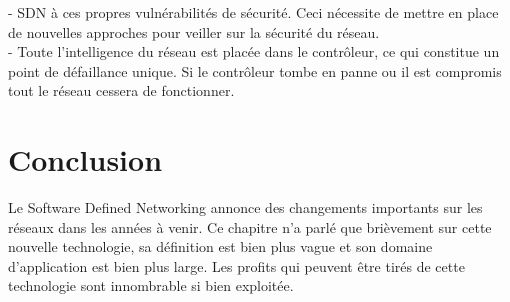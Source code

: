 \noindent- SDN à ces propres vulnérabilités de sécurité. Ceci nécessite de mettre en place de nouvelles approches pour veiller sur la sécurité du réseau.\\

\noindent- Toute l'intelligence du réseau est placée dans le contrôleur, ce qui constitue un point de défaillance unique. Si le contrôleur tombe en panne ou il est compromis tout le réseau cessera de fonctionner.

\section{Conclusion}
Le Software Defined Networking annonce des changements importants sur les réseaux dans les années à venir. Ce chapitre n'a parlé que brièvement sur cette nouvelle technologie, sa définition est bien plus vague et son domaine d'application est bien plus large. Les profits qui peuvent être tirés de cette technologie sont innombrable si bien exploitée.
